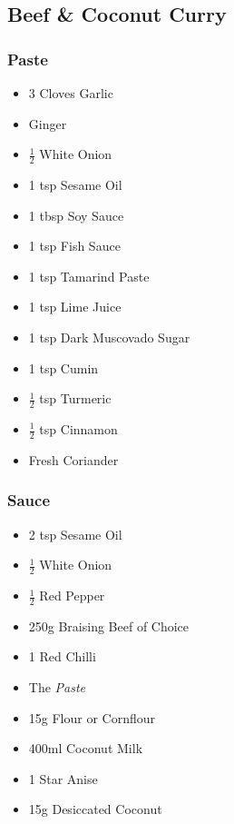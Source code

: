 \documentclass[11pt, english]{article}
\begin{document}
\newpage

	\subsection{Beef \& Coconut Curry}

		\subsubsection*{Paste}

	\begin{itemize}
	\setlength\itemsep{0cm}
		\item 3 Cloves Garlic
                \item Ginger
                \item $\frac{1}{2}$ White Onion
                \item 1 tsp Sesame Oil
                \item 1 tbsp Soy Sauce
                \item 1 tsp Fish Sauce
                \item 1 tsp Tamarind Paste
                \item 1 tsp Lime Juice
		\item 1 tsp Dark Muscovado Sugar
                \item 1 tsp Cumin
                \item $\frac{1}{2}$ tsp Turmeric
		\item $\frac{1}{2}$ tsp Cinnamon
                \item Fresh Coriander
	\end{itemize}

		\subsubsection*{Sauce}

	\begin{itemize}
        \setlength\itemsep{0cm}
                \item 2 tsp Sesame Oil
		\item $\frac{1}{2}$ White Onion
		\item $\frac{1}{2}$ Red Pepper
		\item 250g Braising Beef of Choice
		\item 1 Red Chilli
		\item The \textit{Paste}
		\item 15g Flour or Cornflour
		\item 400ml Coconut Milk
		\item 1 Star Anise
		\item 15g Desiccated Coconut
        \end{itemize}
\end{document}
